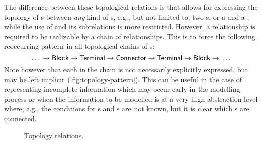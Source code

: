 The difference between these topological relations is that
 allows for expressing the topology of s
between \emph{any} kind of s, e.g., but not limited to,
two s, or a  and a , while the use
of  and its subrelations is more restricted.
However, a  relationship
is required to be 
realizable by a
chain of  relationships.
%
This is to force the following reoccurring pattern in all topological chains of
s:
$$\ldots {}
\rightarrow \textsf{Block}
\rightarrow \textsf{Terminal}
\rightarrow \textsf{Connector}
\rightarrow \textsf{Terminal}
\rightarrow \textsf{Block}
\rightarrow {} \ldots$$
%
Note however that each  in the chain is not necessarily explicitly
expressed, but may be left implicit
%
(\autoref{fig:topology-pattern}).
%
This can be useful in the case of representing incomplete information
which may occur early
in the modelling process or when
the information to be 
modelled is at a very high
abstraction level where, e.g., the conditions for
s and s are not known, but it is clear
which s are connected.


\begin{figure}
\centering

\caption{\label{uml-topology} Topology relations.}
\end{figure}



